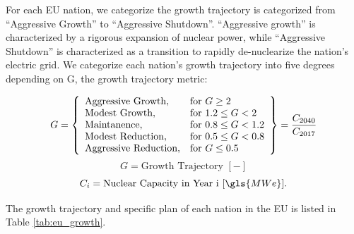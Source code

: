 \documentclass{article}
\begin{document}
\FloatBarrier

For each \gls{EU} nation, we categorize the growth trajectory is categorized from
``Aggressive Growth'' to ``Aggressive Shutdown''. ``Aggressive growth'' is
characterized by a rigorous expansion of nuclear power, while
``Aggressive Shutdown'' is characterized as a transition to rapidly
de-nuclearize the nation's electric grid. We categorize each nation's growth 
trajectory into five degrees depending on G, the growth trajectory metric:

 \[
 G = \left\{\begin{array}{ll}
 \text{Aggressive Growth}, & \text{for } G \geq 2\\
 \text{Modest Growth}, & \text{for } 1.2 \leq G < 2\\
 \text{Maintanence}, & \text{for } 0.8 \leq G < 1.2 \\
 \text{Modest Reduction}, & \text{for } 0.5 \leq G< 0.8\\
 \text{Aggressive Reduction}, & \text{for } G \leq 0.5
 \end{array}\right\} = \frac{C_{2040}}{C_{2017}}\\\\
 \]
 \[
  G = \text{Growth Trajectory  } [-] 
 \]
 \[
 C_{i} = \text{Nuclear Capacity in Year i  } [\gls{MWe}].
 \]

The growth trajectory and specific plan of each nation in the \gls{EU} 
is listed in Table \ref{tab:eu_growth}.  
\end{document}

